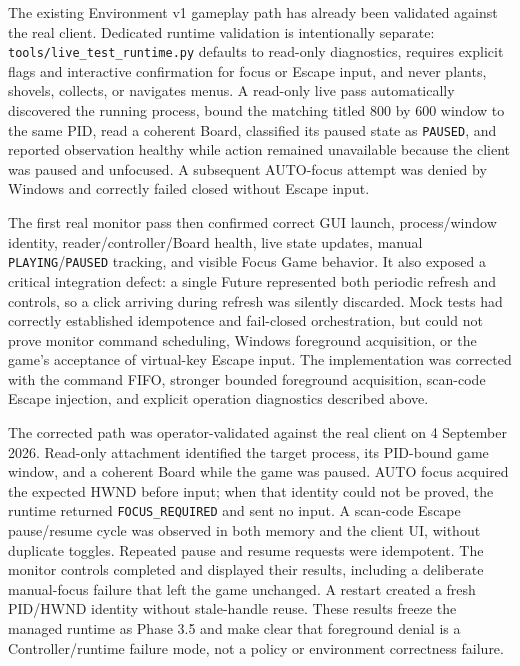 \documentclass[11pt,a4paper]{article}
\begin{document}
The existing Environment v1 gameplay path has already been validated against the real client. Dedicated runtime validation is intentionally separate: \texttt{tools/live\_test\_runtime.py} defaults to read-only diagnostics, requires explicit flags and interactive confirmation for focus or Escape input, and never plants, shovels, collects, or navigates menus. A read-only live pass automatically discovered the running process, bound the matching titled 800 by 600 window to the same PID, read a coherent Board, classified its paused state as \texttt{PAUSED}, and reported observation healthy while action remained unavailable because the client was paused and unfocused. A subsequent AUTO-focus attempt was denied by Windows and correctly failed closed without Escape input.

The first real monitor pass then confirmed correct GUI launch, process/window identity, reader/controller/Board health, live state updates, manual \texttt{PLAYING}/\texttt{PAUSED} tracking, and visible Focus Game behavior. It also exposed a critical integration defect: a single Future represented both periodic refresh and controls, so a click arriving during refresh was silently discarded. Mock tests had correctly established idempotence and fail-closed orchestration, but could not prove monitor command scheduling, Windows foreground acquisition, or the game's acceptance of virtual-key Escape input. The implementation was corrected with the command FIFO, stronger bounded foreground acquisition, scan-code Escape injection, and explicit operation diagnostics described above.

The corrected path was operator-validated against the real client on 4 September 2026. Read-only attachment identified the target process, its PID-bound game window, and a coherent Board while the game was paused. AUTO focus acquired the expected HWND before input; when that identity could not be proved, the runtime returned \texttt{FOCUS\_REQUIRED} and sent no input. A scan-code Escape pause/resume cycle was observed in both memory and the client UI, without duplicate toggles. Repeated pause and resume requests were idempotent. The monitor controls completed and displayed their results, including a deliberate manual-focus failure that left the game unchanged. A restart created a fresh PID/HWND identity without stale-handle reuse. These results freeze the managed runtime as Phase 3.5 and make clear that foreground denial is a Controller/runtime failure mode, not a policy or environment correctness failure.
\end{document}
